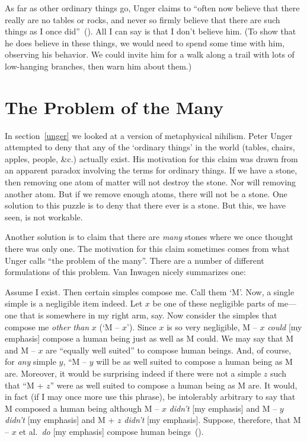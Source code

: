 \documentclass[11pt]{article}
\newenvironment{squote}{%
	\begin{spacing}{1}
	\begin{list}{}{%
	\setlength{\labelwidth}{0pt}%
	\rightmargin\leftmargin%
	}
	\item\relax
	}{%
	\end{list}%
	\end{spacing}
	}
\begin{document}
\begin{spacing}{1.5}
As far as other ordinary things go, Unger claims to ``often now believe that there really are no tables or rocks, and never so firmly believe that there are such things as I once did''~(\citeyear[543]{unger1980b}). All I can say is that I don't believe him. (To show that he does believe in these things, we would need to spend some time with him, observing his behavior. We could invite him for a walk along a trail with lots of low-hanging branches, then warn him about them.)

\section{The Problem of the Many}
\label{many}
In section~\ref{unger} we looked at a version of metaphysical nihilism. Peter Unger attempted to deny that any of the `ordinary things' in the world (tables, chairs, apples, people, \&c.) actually exist. His motivation for this claim was drawn from an apparent paradox involving the terms for ordinary things. If we have a stone, then removing one atom of matter will not destroy the stone. Nor will removing another atom. But if we remove enough atoms, there will not be a stone. One solution to this puzzle is to deny that there ever is a stone. But this, we have seen, is not workable.

Another solution is to claim that there are {\em many} stones where we once thought there was only one. The motivation for this claim sometimes comes from what Unger calls ``the problem of the many''. There are a number of different formulations of this problem. Van Inwagen nicely summarizes one:
\begin{squote}
Assume I exist. Then certain simples compose me. Call them `M'. Now, a single simple is a negligible item indeed. Let $x$ be one of these negligible parts of me---one that is somewhere in my right arm, say. Now consider the simples that compose me {\em other than} $x$ (`M -- $x$'). Since $x$ is so very negligible, M -- $x$ {\em could} [my emphasis] compose a human being just as well as M could. We may say that M and M -- $x$ are ``equally well suited'' to compose human beings. And, of course, for {\em any} simple $y$, ``M -- $y$ will be as well suited to compose a human being as M are. Moreover, it would be surprising indeed if there were not a simple $z$ such that ``M + $z$'' were as well suited to compose a human being as M are. It would, in fact (if I may once more use this phrase), be intolerably arbitrary to say that M composed a human being although M -- $x$ {\em didn't} [my emphasis] and M -- $y$ {\em didn't} [my emphasis] and M + $z$ {\em didn't} [my emphasis]. Suppose, therefore, that M -- $x$ et al.\ {\em do} [my emphasis] compose human beings~(\citeyear[215]{inwagen1995}).
\end{squote}


\end{spacing}
\end{document}
